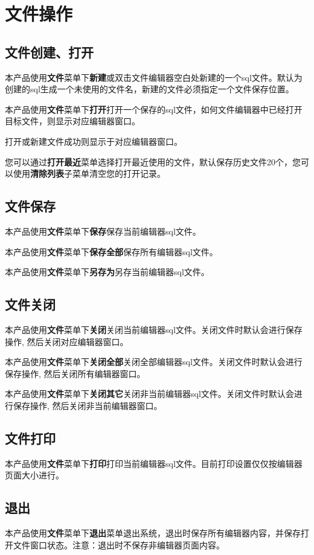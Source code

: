 \section{文件操作}\label{file}

\linespread{1.2}
\large

\subsection{文件创建、打开}
\bigskip
本产品使用\textbf{文件}菜单下\textbf{新建}或双击文件编辑器空白处新建的一个sql文件。默认为创建的sql生成一个未使用的文件名，新建的文件必须指定一个文件保存位置。

本产品使用\textbf{文件}菜单下\textbf{打开}打开一个保存的sql文件，如何文件编辑器中已经打开目标文件，则显示对应编辑器窗口。

打开或新建文件成功则显示于对应编辑器窗口。

您可以通过\textbf{打开最近}菜单选择打开最近使用的文件，默认保存历史文件20个，您可以使用\textbf{清除列表}子菜单清空您的打开记录。

\subsection{文件保存}
\bigskip
本产品使用\textbf{文件}菜单下\textbf{保存}保存当前编辑器sql文件。

本产品使用\textbf{文件}菜单下\textbf{保存全部}保存所有编辑器sql文件。

本产品使用\textbf{文件}菜单下\textbf{另存为}另存当前编辑器sql文件。

\subsection{文件关闭}
本产品使用\textbf{文件}菜单下\textbf{关闭}关闭当前编辑器sql文件。关闭文件时默认会进行保存操作, 然后关闭对应编辑器窗口。

本产品使用\textbf{文件}菜单下\textbf{关闭全部}关闭全部编辑器sql文件。关闭文件时默认会进行保存操作, 然后关闭所有编辑器窗口。

本产品使用\textbf{文件}菜单下\textbf{关闭其它}关闭非当前编辑器sql文件。关闭文件时默认会进行保存操作, 然后关闭非当前编辑器窗口。

\subsection{文件打印}
\bigskip
本产品使用\textbf{文件}菜单下\textbf{打印}打印当前编辑器sql文件。目前打印设置仅仅按编辑器页面大小进行。

\subsection{退出}
\bigskip
本产品使用\textbf{文件}菜单下\textbf{退出}菜单退出系统，退出时保存所有编辑器内容，并保存打开文件窗口状态。{\color{red}注意}：退出时不保存非编辑器页面内容。
